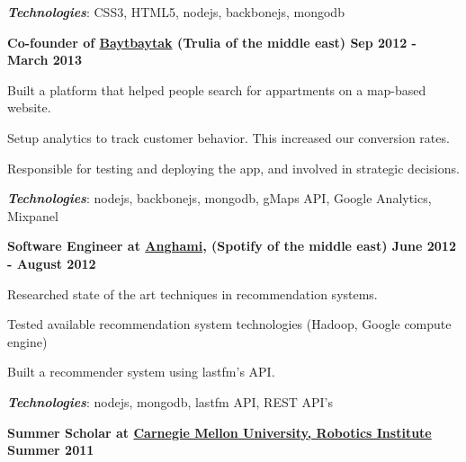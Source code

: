 \documentclass[10pt]{article}
\newenvironment{innerlist}[1][\enskip\textbullet]%
        {\begin{compactitem}[#1]}{\end{compactitem}}
\begin{document}
\vspace{0.2cm}
\hspace{0.25cm}\textbf{\textit{Technologies}}: 
CSS3, HTML5, nodejs, backbonejs, mongodb

\vspace{0.4cm}


\textbf{Co-founder of \href{http://baytbaytak.com}{Baytbaytak} (Trulia of the middle east) \hfill \small Sep 2012 - March 2013} 
\vspace{0.1cm}
\begin{innerlist}
\item Built a platform that helped people search for appartments on a map-based website.  
\item Setup analytics to track customer behavior. This increased our conversion rates. 
\item Responsible for testing and deploying the app, and involved in strategic decisions.
\end{innerlist}

\vspace{0.2cm}
\hspace{0.25cm}\textbf{\textit{Technologies}}: 
nodejs, backbonejs, mongodb, gMaps API, Google Analytics, Mixpanel

\vspace{0.4cm}

\textbf{
  Software Engineer at \href{http://anghami.com/}{Anghami}, (Spotify of the middle east)
  \hfill \small June 2012 - August 2012
}
\vspace{0.1cm}
\begin{innerlist}
\item Researched state of the art techniques in recommendation systems.
\item Tested available recommendation system technologies (Hadoop, Google compute engine)
\item Built a recommender system using lastfm's API.
\end{innerlist}


\vspace{0.2cm}
\hspace{0.25cm}\textbf{\textit{Technologies}}: 
nodejs, mongodb, lastfm API, REST API's

\vspace{0.4cm}

\textbf{Summer Scholar at \href{http://www.ri.cmu.edu/}{Carnegie Mellon University, Robotics Institute}}
\hfill \textbf{Summer 2011}
\vspace{0.1cm}
\end{document}
